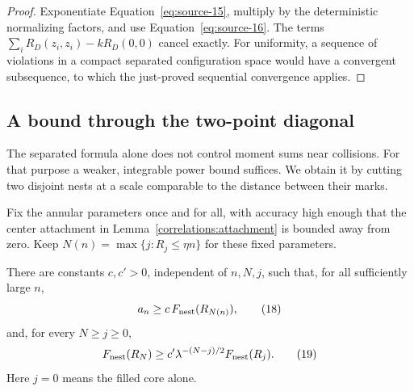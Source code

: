 \begin{proof}
Exponentiate Equation~\eqref{eq:source-15}, multiply by the
deterministic normalizing factors, and use
Equation~\eqref{eq:source-16}.
The terms
\(\sum_iR_D(z_i,z_i)-kR_D(0,0)\) cancel exactly.
For uniformity, a sequence of violations in a compact separated
configuration space would have a convergent subsequence, to which
the just-proved sequential convergence applies.
\end{proof}

\subsection{A bound through the two-point diagonal}

The separated formula alone does not control moment sums near
collisions.  For that purpose a weaker, integrable power bound
suffices.  We obtain it by cutting two disjoint nests at a scale
comparable to the distance between their marks.

Fix the annular parameters once and for all, with accuracy high
enough that the center attachment in
Lemma~\ref{correlations:attachment} is bounded away from zero.
Keep \(N(n)=\max\{j:R_j\leq\eta n\}\) for these fixed parameters.

\begin{lemma}\label{correlations:nest-bounds}
There are constants \(c,c'>0\), independent of \(n,N,j\), such that,
for all sufficiently large \(n\),
\begin{equation}
 a_n\geq c\,F_{\rm nest}(R_{N(n)}),
 \tag{18}\label{eq:source-18}
\end{equation}
and, for every \(N\geq j\geq0\),
\begin{equation}
 F_{\rm nest}(R_N)
       \geq c'\lambda^{-(N-j)/2}F_{\rm nest}(R_j).
 \tag{19}\label{eq:source-19}
\end{equation}
Here \(j=0\) means the filled core alone.
\end{lemma}

